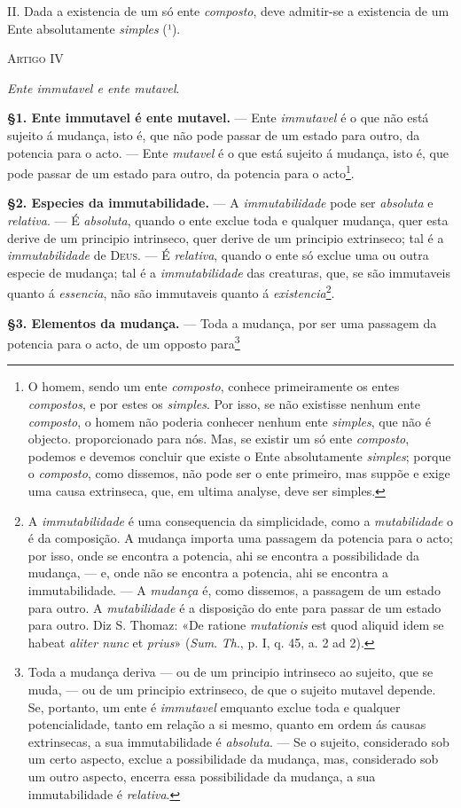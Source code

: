  II. Dada a existencia de um só ente \emph{composto}, deve admitir-se a existencia de um Ente absolutamente \emph{simples} (¹).

\textsc{Artigo} IV

\emph{Ente immutavel e ente mutavel}.

\textbf{§1. Ente immutavel é ente mutavel.} --- Ente \emph{immutavel} é o que não está sujeito á mudança, isto é, que não pode passar de um estado para outro, da potencia para o acto. --- Ente \emph{mutavel} é o que está sujeito á mudança, isto é, que pode passar de um estado para outro, da potencia para o acto\footnote{O homem, sendo um ente \emph{composto}, conhece primeiramente os entes \emph{compostos}, e por estes os \emph{simples}. Por isso, se não existisse nenhum ente \emph{composto}, o homem não poderia conhecer nenhum ente \emph{simples}, que não é objecto. proporcionado para nós. Mas, se existir um só ente \emph{composto}, podemos e devemos concluir que existe o Ente absolutamente \emph{simples}; porque o \emph{composto}, como dissemos, não pode ser o ente primeiro, mas suppõe e exige uma causa extrinseca, que, em ultima analyse, deve ser simples.}.

\textbf{§2. Especies da immutabilidade.} --- A \emph{immutabilidade} pode ser \emph{absoluta} e \emph{relativa}. --- É \emph{absoluta}, quando o ente exclue toda e qualquer mudança, quer esta derive de um principio intrinseco, quer derive de um principio extrinseco; tal é a \emph{immutabilidade} de \textsc{Deus}. --- É \emph{relativa}, quando o ente só exclue uma ou outra especie de mudança; tal é a \emph{immutabilidade} das creaturas, que, se são immutaveis quanto á \emph{essencia}, não são immutaveis quanto á \emph{existencia}\footnote{A \emph{immutabilidade} é uma consequencia da simplicidade, como a \emph{mutabilidade} o é da composição. A mudança importa uma passagem da potencia para o acto; por isso, onde se encontra a potencia, ahi se encontra a possibilidade da mudança, --- e, onde não se encontra a potencia, ahi se encontra a immutabilidade. --- A \emph{mudança} é, como dissemos, a passagem de um estado para outro. A \emph{mutabilidade} é a disposição do ente para passar de um estado para outro. Diz S. Thomaz: «De ratione \emph{mutationis} est quod aliquid idem se habeat \emph{aliter nunc} et \emph{prius}» (\emph{Sum}. \emph{Th}., p. I, q. 45, a. 2 ad 2).}.

\textbf{§3. Elementos da mudança.} --- Toda a mudança, por ser uma passagem da potencia para o acto, de um opposto para\footnote{Toda a mudança deriva --- ou de um principio intrinseco ao sujeito, que se muda, --- ou de um principio extrinseco, de que o sujeito mutavel depende. Se, portanto, um ente é \emph{immutavel} emquanto exclue toda e qualquer potencialidade, tanto em relação a si mesmo, quanto em ordem ás causas extrinsecas, a sua immutabilidade é \emph{absoluta}. --- Se o sujeito, considerado sob um certo aspecto, exclue a possibilidade da mudança, mas, considerado sob um outro aspecto, encerra essa possibilidade da mudança, a sua immutabilidade é \emph{relativa}.}